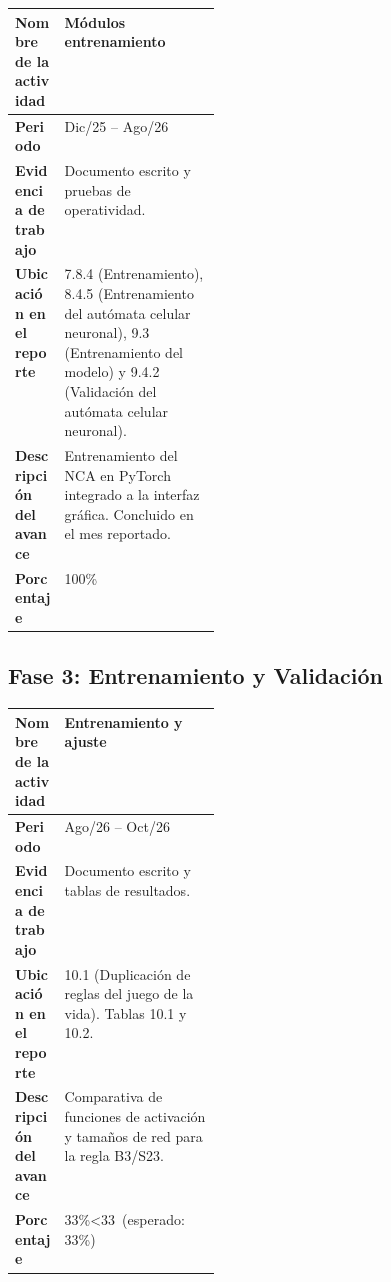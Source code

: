\documentclass[letterpaper,10pt,oneside]{article}
\def\espEntrenamiento{33}   \def\realEntrenamiento{33}
\newcommand\porcentaje[2]{#2\%\ifnum#2<#1\ (esperado: #1\%)\fi}
\begin{document}
	\begin{table}[H]
		\centering
		\renewcommand{\arraystretch}{1.25}
		\begin{tabularx}{\linewidth}{|>{\raggedright\bfseries\arraybackslash}p{0.24\linewidth}|X|}
			\hline
			\rowcolor{encabezado}
			Nombre de la actividad & \textbf{Módulos entrenamiento} \\ \hline
			Periodo & Dic/25 -- Ago/26 \\ \hline
			Evidencia de trabajo & Documento escrito y pruebas de operatividad. \\ \hline
			Ubicación en el reporte & 7.8.4 (Entrenamiento), 8.4.5 (Entrenamiento del autómata celular neuronal), 9.3 (Entrenamiento del modelo) y 9.4.2 (Validación del autómata celular neuronal). \\ \hline
			Descripción del avance & Entrenamiento del NCA en PyTorch integrado a la interfaz gráfica. Concluido en el mes reportado. \\ \hline
			Porcentaje & 100\% \\ \hline
		\end{tabularx}
	\end{table}

	\subsection*{Fase 3: Entrenamiento y Validación}

	\begin{table}[H]
		\centering
		\renewcommand{\arraystretch}{1.25}
		\begin{tabularx}{\linewidth}{|>{\raggedright\bfseries\arraybackslash}p{0.24\linewidth}|X|}
			\hline
			\rowcolor{encabezado}
			Nombre de la actividad & \textbf{Entrenamiento y ajuste} \\ \hline
			Periodo & Ago/26 -- Oct/26 \\ \hline
			Evidencia de trabajo & Documento escrito y tablas de resultados. \\ \hline
			Ubicación en el reporte & 10.1 (Duplicación de reglas del juego de la vida). Tablas 10.1 y 10.2. \\ \hline
			Descripción del avance & Comparativa de funciones de activación y tamaños de red para la regla B3/S23. \\ \hline
			Porcentaje & \porcentaje{\espEntrenamiento}{\realEntrenamiento} \\ \hline
		\end{tabularx}
	\end{table}
\end{document}
